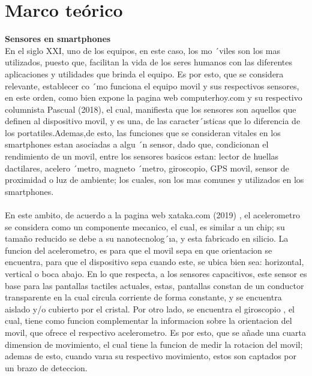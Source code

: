 \documentclass[conference,compsoc,onecolumn]{IEEEtran}
\begin{document}
\section{Marco teórico}
\label{sec:marco}
\textbf{Sensores  en  smartphones }\\En el siglo XXI, uno de los equipos, en este caso, los mo ´viles son los mas utilizados, puesto que, facilitan la vida de los seres humanos con las diferentes aplicaciones y utilidades que brinda el equipo. Es  por  esto,  que  se  considera  relevante,  establecer  co ´mo  funciona  el  equipo  movil  y  sus  respectivos  sensores,  en este orden, como bien expone la pagina web computerhoy.com y su respectivo columnista Pascual (2018), el cual, manifiesta  que  los  sensores  son  aquellos  que  definen  al  dispositivo  movil,  y  es  una,  de  las  caracter´ısticas  que lo  diferencia  de  los  portatiles.Ademas,de  esto,  las  funciones  que  se  consideran  vitales  en  los  smartphones  estan asociadas a algu ´n sensor, dado que, condicionan el rendimiento de un movil, entre los sensores basicos estan: lector de huellas dactilares, acelero ´metro, magneto ´metro, giroscopio, GPS movil, sensor de proximidad o luz de ambiente; los cuales, son los mas comunes y utilizados en los smartphones. 
\\
\\
En este ambito, de acuerdo a la pagina web xataka.com (2019) , el acelerometro se considera como un componente mecanico, el cual, es similar a un chip; su tamaño reducido se debe a su nanotecnolog´ıa, y esta fabricado en silicio. La funcion del acelerometro, es para que el movil sepa en que  orientacion se encuentra, para que el dispositivo sepa cuando este, se ubica bien sea: horizontal, vertical o boca abajo. En lo que respecta, a los sensores capacitivos, este sensor es base para las pantallas tactiles actuales, estas, pantallas constan de un conductor transparente en la cual circula corriente de forma constante, y se encuentra aislado y/o cubierto por el cristal. Por otro lado, se encuentra el giroscopio , el cual, tiene como funcion complementar la informacion sobre la orientacion del movil, que ofrece el respectivo acelerometro. Es por esto, que se añade una cuarta dimension de movimiento, el cual tiene la funcion de medir la rotacion del movil; ademas de esto, cuando varıa su respectivo movimiento, estos son captados por un brazo de deteccion. 
\\
\\
\end{document}
